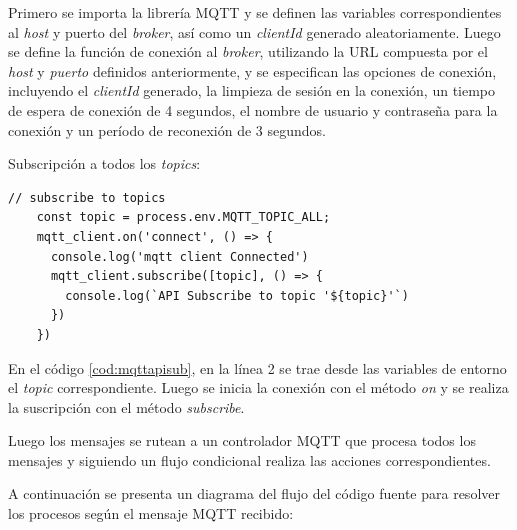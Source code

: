Primero se importa la librería MQTT y se definen las variables correspondientes al \textit{host} y puerto del \textit{broker}, así como un \textit{clientId} generado aleatoriamente. Luego se define la función de conexión al \textit{broker}, utilizando la URL compuesta por el \textit{host} y \textit{puerto} definidos anteriormente, y se especifican las opciones de conexión, incluyendo el \textit{clientId} generado, la limpieza de sesión en la conexión, un tiempo de espera de conexión de 4 segundos, el nombre de usuario y contraseña para la conexión y un período de reconexión de 3 segundos.


Subscripción a todos los \textit{topics}:

\begin{lstlisting}[label=cod:mqttapisub,caption=Subscripción a \textit{topics} en API REST.]
// subscribe to topics
    const topic = process.env.MQTT_TOPIC_ALL;
    mqtt_client.on('connect', () => {
      console.log('mqtt client Connected')
      mqtt_client.subscribe([topic], () => {
        console.log(`API Subscribe to topic '${topic}'`)
      })
    })
\end{lstlisting}

En el código \ref{cod:mqttapisub}, en la línea 2 se trae desde las variables de entorno el \textit{topic} correspondiente. Luego se inicia la conexión con el método \textit{on} y se realiza la suscripción con el método \textit{subscribe}. 

Luego los mensajes se rutean a un controlador MQTT que procesa todos los mensajes y siguiendo un flujo condicional realiza las acciones correspondientes.

A continuación se presenta un diagrama del flujo del código fuente para resolver los procesos según el mensaje MQTT recibido:

